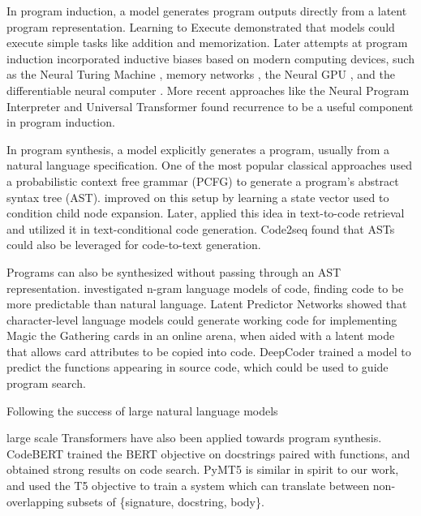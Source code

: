 In program induction, a model generates program outputs directly from a latent program representation. Learning to Execute \citep{zaremba2014learning} demonstrated that models could execute simple tasks like addition and memorization. Later attempts at program induction incorporated inductive biases based on modern computing devices, such as the Neural Turing Machine \citep{graves2014neural}, memory networks \citep{weston2015memory,sukhbaatar2015endtoend}, the Neural GPU \citep{kaiser2015neural}, and the differentiable neural computer \citep{graves2016hybrid}. More recent approaches like the Neural Program Interpreter \citep{reed2016neural,shin2018improving,pierrot2021learning} and Universal Transformer \citep{dehghani2019universal} found recurrence to be a useful component in program induction.

In program synthesis, a model explicitly generates a program, usually from a natural language specification. One of the most popular classical approaches used a probabilistic context free grammar (PCFG) to generate a program’s abstract syntax tree (AST). \citet{maddison2014structured} improved on this setup by learning a state vector used to condition child node expansion. Later, \citet{allamanis2015code} applied this idea in text-to-code retrieval and \citet{yin2017syntactic} utilized it in text-conditional code generation. Code2seq \citep{alon2018code2seq} found that ASTs could also be leveraged for code-to-text generation.

Programs can also be synthesized without passing through an AST representation. \citet{hindle2012naturalness} investigated n-gram language models of code, finding code to be more predictable than natural language. Latent Predictor Networks \citep{ling2016latent} showed that character-level language models could generate working code for implementing Magic the Gathering cards in an online arena, when aided with a latent mode that allows card attributes to be copied into code. DeepCoder \citep{balog2017deepcoder} trained a model to predict the functions appearing in source code, which could be used to guide program search.

Following the success of large natural language models \citep{devlin2018bert,radford2019gpt2,liu2019roberta,raffel2020t5,brown2020gpt3}

large scale Transformers have also been applied towards program synthesis. CodeBERT \citep{feng2020codebert} trained the BERT objective on docstrings paired with functions, and obtained strong results on code search. PyMT5 \citep{clement2020pymt5} is similar in spirit to our work, and used the T5 objective to train a system which can translate between non-overlapping subsets of \{signature, docstring, body\}.

